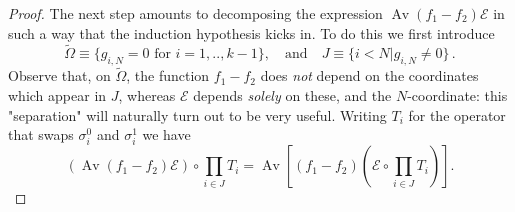 \documentclass[a4paper,12pt,oneside,reqno]{amsart}
\numberwithin{equation}{section}
\begin{document}
\begin{proof}
The next step amounts to decomposing the expression $\operatorname{Av}  \left(f_1-f_2\right)\mathcal{E}$ in such 
a way that the induction hypothesis kicks in. To do this we first introduce
\[
\tilde \Omega {\equiv} \{g_{i,N} = 0 \mbox{ for } i=1,..,k-1\}, \quad \text{and} \quad J {\equiv} \{i<N|g_{i,N}\neq 0\}\,.
\]
Observe that, on $\tilde \Omega$, the function $f_1-f_2$ does {\it not} depend on the coordinates which appear in $J$, whereas $\mathcal{E}$ depends {\it solely} on these, and the $N$-coordinate: this "separation" will naturally turn out to be very useful. Writing $T_i$ for the operator that swaps $\sigma_i^0$ and $\sigma_i^1$ we have
$$\left(\operatorname{Av} \left(f_1-f_2 \right) \mathcal{E}\right)\circ \prod\limits_{i\in J} T_i = \operatorname{Av} \left[\left(f_1-f_2 \right) \left(\mathcal{E} \circ \prod\limits_{i\in J} T_i\right)\right].$$


\end{proof}
\end{document}

